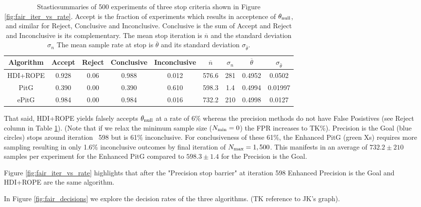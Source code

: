 \documentclass{article}
\begin{document}
\begin{table}[h!]\label{tab:fair_iter_vs_rate}
  \begin{center}
  \begin{tabular}{c|c|c|c|c|c|c|c|c}
    \hline
    Algorithm & Accept & Reject & Conclusive & Inconclusive & $\overline{n}$ & $\sigma_n$ & $\overline{\theta}$ & $\sigma_{\hat{\theta}}$\\
    \hline
    HDI+ROPE & 0.928 & 0.06 & 0.988 & 0.012 & 576.6 & 281 & 0.4952 & 0.0502 \\
    PitG & 0.390 & 0.00 & 0.390 & 0.610 & 598.3 & 1.4 & 0.4994 & 0.01997 \\
    ePitG & 0.984 & 0.00 & 0.984 & 0.016 & 732.2 & 210 & 0.4998 & 0.0127\\
    \hline
  \end{tabular}
  \caption{Stasticsummaries of 500 experiments of three stop criteria shown in Figure \ref{fig:fair_iter_vs_rate}. Accept
  is the fraction of experiments which results in acceptence of $\theta_{\rm null}$,
  and similar for Reject, Conclusive and Inconclusive. Conclusive is the sum of Accept and Reject and Inconclusive is its complementary. The mean stop iteration is $\overline{n}$ and the standard deviation $\sigma_n$
  The mean sample rate at stop is $\overline{\theta}$ and its standard deviation $\sigma_{\hat{\theta}}$.
  }
\end{center}
\end{table}

That said, HDI+ROPE yields falsely accepts $\theta_{\rm null}$ at a rate of 6\% 
whereas the precision methods do not have False Posistives (see Reject column in Table \ref{tab:fair_iter_vs_rate}).
(Note that if we relax the minimum sample size ($N_{\rm min}=0$) the FPR increases to TK\%).
Precision is the Goal (blue circles) stops around iteration ~598 but is 61\% inconclusive.
For conclusiveness of these 61\%, the Enhanced PitG (green Xs) requires more sampling 
resulting in only 1.6\% inconclusive outcomes by final iteration of $N_{\rm max}=1,500$.
This manifests in an average of $732.2\pm 210$ samples per experiment for the Enhanced PitG
compared to $598.3\pm 1.4$ for the Precision is the Goal.

Figure \ref{fig:fair_iter_vs_rate} highlights that after the "Precision stop barrier" at iteration 598 Enhanced Precision is the Goal and HDI+ROPE are the same algorithm.

In Figure \ref{fig:fair_decisions} we explore the decision rates of the three algorithms.
(TK reference to JK's graph).
\end{document}
